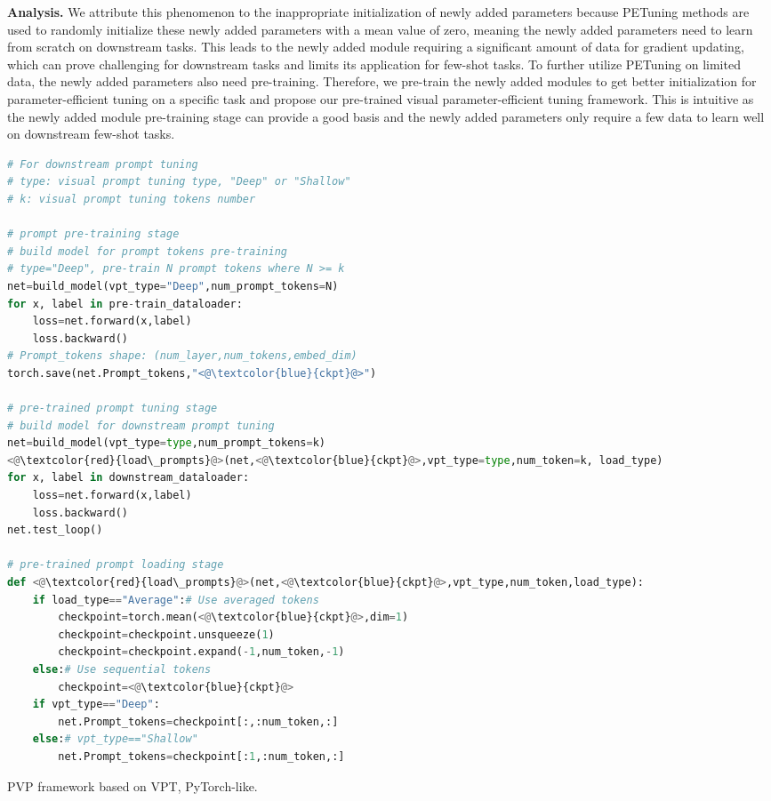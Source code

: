 \documentclass[10pt,journal,letterpaper,compsoc]{IEEEtran}
\begin{document}
\textbf{Analysis.} We attribute this phenomenon to the inappropriate initialization of newly added parameters because PETuning methods are used to randomly initialize these newly added parameters with a mean value of zero, meaning the newly added parameters need to learn from scratch on downstream tasks. This leads to the newly added module requiring a significant amount of data for gradient updating, which can prove challenging for downstream tasks and limits its application for few-shot tasks. To further utilize PETuning on limited data, the newly added parameters also need pre-training. Therefore, we pre-train the newly added modules to get better initialization for parameter-efficient tuning on a specific task and propose our pre-trained visual parameter-efficient tuning framework. This is intuitive as the newly added module pre-training stage can provide a good basis and the newly added parameters only require a few data to learn well on downstream few-shot tasks.

\begin{algorithm}[t]
\begin{lstlisting}[language=Python]
# For downstream prompt tuning
# type: visual prompt tuning type, "Deep" or "Shallow"
# k: visual prompt tuning tokens number

# prompt pre-training stage
# build model for prompt tokens pre-training
# type="Deep", pre-train N prompt tokens where N >= k
net=build_model(vpt_type="Deep",num_prompt_tokens=N)
for x, label in pre-train_dataloader:
    loss=net.forward(x,label)
    loss.backward()
# Prompt_tokens shape: (num_layer,num_tokens,embed_dim)
torch.save(net.Prompt_tokens,"<@\textcolor{blue}{ckpt}@>")

# pre-trained prompt tuning stage
# build model for downstream prompt tuning
net=build_model(vpt_type=type,num_prompt_tokens=k)
<@\textcolor{red}{load\_prompts}@>(net,<@\textcolor{blue}{ckpt}@>,vpt_type=type,num_token=k, load_type)
for x, label in downstream_dataloader:
    loss=net.forward(x,label)
    loss.backward()
net.test_loop()

# pre-trained prompt loading stage
def <@\textcolor{red}{load\_prompts}@>(net,<@\textcolor{blue}{ckpt}@>,vpt_type,num_token,load_type):
    if load_type=="Average":# Use averaged tokens
        checkpoint=torch.mean(<@\textcolor{blue}{ckpt}@>,dim=1)
        checkpoint=checkpoint.unsqueeze(1)
        checkpoint=checkpoint.expand(-1,num_token,-1)
    else:# Use sequential tokens
        checkpoint=<@\textcolor{blue}{ckpt}@>
    if vpt_type=="Deep":
        net.Prompt_tokens=checkpoint[:,:num_token,:]
    else:# vpt_type=="Shallow"
        net.Prompt_tokens=checkpoint[:1,:num_token,:]
\end{lstlisting}
\caption{PVP framework based on VPT, PyTorch-like.}
\label{alg:vppt}
\end{algorithm}
\end{document}
